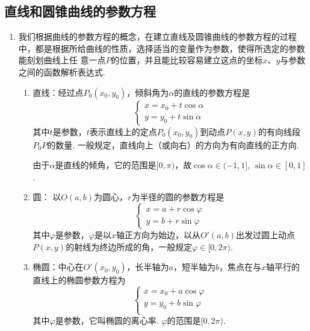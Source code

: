 \subsection{直线和圆锥曲线的参数方程}
\begin{enumerate}
    \item 我们根据曲线的参数方程的概念，在建立直线及圆锥曲线的参数方程的过程中，都是根据所给曲线的性质，选择适当的变量作为参数，使得所选定的参数能刻划曲线上任
意一点$P$的位置，并且能比较容易建立这点的坐标$x$、$y$与参数之间的函数解析表达式.
\begin{enumerate}[(1)]
    \item 直线：经过点$P_0(x_0,y_0)$，倾斜角为$\alpha$的直线的参数方程是
\[\begin{cases}
    x=x_0+t\cos\alpha\\
    y=y_0+t\sin\alpha
\end{cases}\]
    其中$t$是参数，$t$表示直线上的定点$P_0(x_0,y_0)$到动点$P(x,y)$的有向线段$\overline{P_0P}$的数量. 一般规定，直线向上（或向右）的方向为有向直线的正方向.
    
    由于$\alpha$是直线的倾角，它的范围是$[0,\pi)$，故$\cos\alpha\in (-1,1]$, $\sin\alpha\in  [0,1]$.
\item 圆： 以$O(a,b)$为圆心，$r$为半径的圆的参数方程是
\[\begin{cases}
    x=a+r\cos\varphi\\
    y=b+r\sin\varphi
\end{cases}\]
    其中$\varphi$是参数，$\varphi$是以$x$轴正方向为始边，以从$O'(a,b)$出发过圆上动点$P(x,y)$的射线为终边所成的角，一般规定$\varphi \in[0,2\pi)$.
   \item 椭圆：中心在$O'(x_0,y_0)$，长半轴为$a$，短半轴为$b$，焦点在与$x$轴平行的直线上的椭圆参数方程为
\[\begin{cases}
    x=x_0+a\cos\varphi\\
    y=y_0+b\sin\varphi\\
\end{cases}\]
    其中$\varphi$是参数，它叫椭圆的离心率. $\varphi$的范围是$[0,2\pi)$.
 

\end{enumerate}
\end{enumerate}
